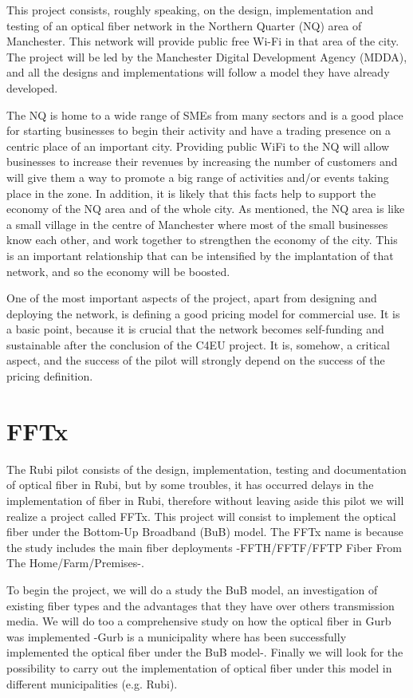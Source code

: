 \documentclass[draftclsnofoot,12pt,journal,onecolumn]{IEEEtran}
\begin{document}
This project consists, roughly speaking, on the design, implementation and testing of an optical fiber network in the Northern Quarter (NQ) area of Manchester. This network will provide public free Wi-Fi in that area of the city. The project will be led by the Manchester Digital Development Agency (MDDA), and all the designs and implementations will follow a model they have already developed.


The NQ is home to a wide range of SMEs from many sectors and is a good place for starting businesses to begin their activity and have a trading presence on a centric place of an important city. Providing public WiFi to the NQ will allow businesses to increase their revenues by increasing the number of customers and will give them a way to promote a big range of activities and/or events taking place in the zone. In addition, it is likely that this facts help to support the economy of the NQ area and of the whole city. As mentioned, the NQ area is like a small village in the centre of Manchester where most of the small businesses know each other, and work together to strengthen the economy of the city. This is an important relationship that can be intensified by the implantation of that network, and so the economy will be boosted.



One of the most important aspects of the project, apart from designing and deploying the network, is defining a good pricing model for commercial use. It is a basic point, because it is crucial that the network becomes self-funding and sustainable after the conclusion of the C4EU project. It is, somehow, a critical aspect, and the success of the pilot will strongly depend on the success of the pricing definition. 

\section{FFTx}
\label{sec:fft}

The Rubi pilot consists of the design, implementation, testing and documentation of optical fiber in Rubi, but by some troubles, it has occurred delays in the implementation of fiber in Rubi, therefore without leaving aside this pilot we will realize a project called FFTx. This project will consist to implement the optical fiber under the Bottom-Up Broadband (BuB) model. The FFTx name is because the study includes the main fiber deployments -FFTH/FFTF/FFTP Fiber From The Home/Farm/Premises-. 

To begin the project, we will do a study the BuB model, an investigation of existing fiber types and the advantages that they have over others transmission media. We will do too a comprehensive study on how the optical fiber in Gurb was implemented -Gurb is a municipality where has been successfully implemented the optical fiber under the BuB model-. Finally we will look for the possibility to carry out the implementation of optical fiber under this model in different municipalities (e.g. Rubi).
\end{document}
